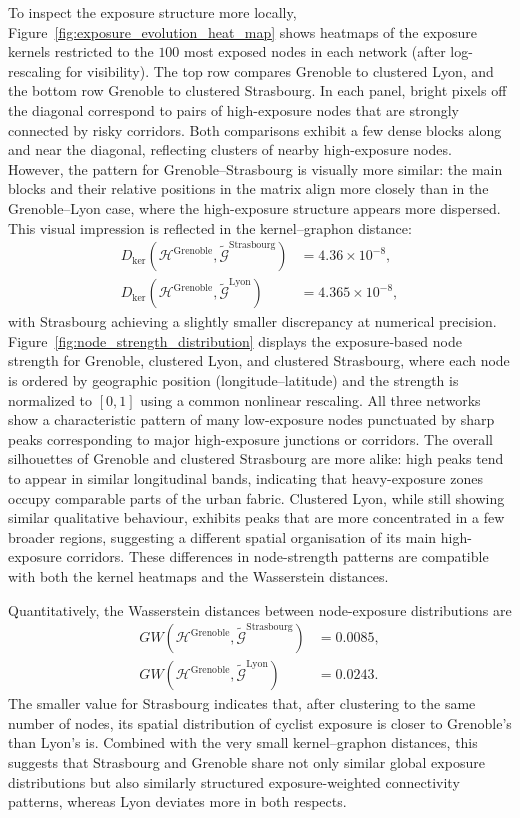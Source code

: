 \documentclass[lettersize,journal]{IEEEtran}
\begin{document}
To inspect the exposure structure more locally, Figure~\ref{fig:exposure_evolution_heat_map} shows heatmaps of the exposure kernels restricted to the $100$ most exposed nodes in each network (after log-rescaling for visibility). The top row compares Grenoble to clustered Lyon, and the bottom row Grenoble to clustered Strasbourg. In each panel, bright pixels off the diagonal correspond to pairs of high-exposure nodes that are strongly connected by risky corridors.  
Both comparisons exhibit a few dense blocks along and near the diagonal, reflecting clusters of nearby high-exposure nodes.  
However, the pattern for Grenoble–Strasbourg is visually more similar: the main blocks and their relative positions in the matrix align more closely than in the Grenoble–Lyon case, where the high-exposure structure appears more dispersed.  
This visual impression is reflected in the kernel–graphon distance:
\begin{align*}
    D_{\mathrm{ker}}(\mathcal{H}^{\mathrm{Grenoble}},\tilde{\mathcal{G}}^{\mathrm{Strasbourg}})
& = 4.36\times 10^{-8},\\
D_{\mathrm{ker}}(\mathcal{H}^{\mathrm{Grenoble}},\tilde{\mathcal{G}}^{\mathrm{Lyon}})
&= 4.365\times 10^{-8},
\end{align*}
with Strasbourg achieving a slightly smaller discrepancy at numerical precision. Figure~\ref{fig:node_strength_distribution} displays the exposure‐based node strength for Grenoble, clustered Lyon, and clustered Strasbourg, where each node is ordered by geographic position (longitude–latitude) and the strength is normalized to $[0,1]$ using a common nonlinear rescaling.  
All three networks show a characteristic pattern of many low-exposure nodes punctuated by sharp peaks corresponding to major high-exposure junctions or corridors. The overall silhouettes of Grenoble and clustered Strasbourg are more alike: high peaks tend to appear in similar longitudinal bands, indicating that heavy-exposure zones occupy comparable parts of the urban fabric.  
Clustered Lyon, while still showing similar qualitative behaviour, exhibits peaks that are more concentrated in a few broader regions, suggesting a different spatial organisation of its main high-exposure corridors.  
These differences in node-strength patterns are compatible with both the kernel heatmaps and the Wasserstein distances.

Quantitatively, the Wasserstein distances between node-exposure distributions are
\begin{align*}
GW(\mathcal{H}^{\mathrm{Grenoble}},\tilde{\mathcal{G}}^{\mathrm{Strasbourg}})
& = 0.0085, \\
GW(\mathcal{H}^{\mathrm{Grenoble}},\tilde{\mathcal{G}}^{\mathrm{Lyon}})
& = 0.0243.
\end{align*}
The smaller value for Strasbourg indicates that, after clustering to the same number of nodes, its spatial distribution of cyclist exposure is closer to Grenoble’s than Lyon’s is.  
Combined with the very small kernel–graphon distances, this suggests that Strasbourg and Grenoble share not only similar global exposure distributions but also similarly structured exposure-weighted connectivity patterns, whereas Lyon deviates more in both respects.
\end{document}
